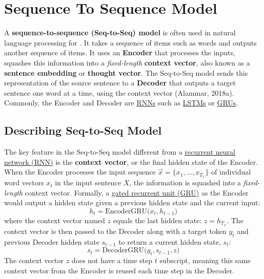 \section{Sequence To Sequence Model} \label{sec:Seq2Seq}

A \textbf{sequence-to-sequence (Seq-to-Seq) model} is often used in natural language processing for . It takes a sequence of items such as words and outputs another sequence of items. It uses an \textbf{Encoder} that processes the inputs, squashes this information into a \emph{fixed-length} \textbf{context vector}, also known as a \textbf{sentence embedding} or \textbf{thought vector}. The Seq-to-Seq model sends this representation of the source sentence to a \textbf{Decoder} that outputs a target sentence one word at a time, using the context vector (Alammar, 2018a). Commonly, the Encoder and Decoder are \hyperref[sec:RNN]{RNNs} such as \hyperref[sec:LSTM]{LSTMs} or \hyperref[sec:GRU]{GRUs}.


\subsection{Describing Seq-to-Seq Model}

The key feature in the Seq-to-Seq model different from a \hyperref[sec:RNN]{recurrent neural network (RNN)} is the \textbf{context vector}, or the final hidden state of the Encoder. When the Encoder processes the input sequence $\overrightarrow{x} = \{ x_1, ..., x_{T_x} \}$ of individual word vectors $x_t$ in the input sentence $X$, the information is squashed into a \emph{fixed-length} context vector. Formally, a \hyperref[sec:GRU]{gated recurrent unit (GRU)} as the Encoder would output a hidden state given a previous hidden state and the current input: 
$$
h_t = \text{EncoderGRU} \Big( x_t, h_{t-1} \Big)
$$ 
where the context vector named $z$ equals the last hidden state: $z = h_{T_x}$. 
\newline 
The context vector is then passed to the Decoder along with a target token $y_t$ and previous Decoder hidden state $s_{t-1}$ to return a current hidden state, $s_t$:
$$
s_t = \text{DecoderGRU} \Big( y_t, s_{t-1}, z \Big)
$$
The context vector $z$ does not have a time step $t$ subscript, meaning this same context vector from the Encoder is reused each time step in the Decoder. 


